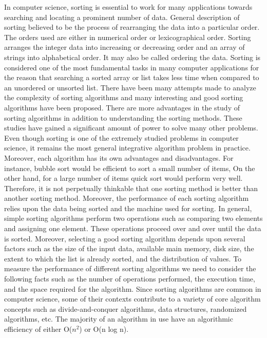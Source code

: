 \documentclass{article}
\begin{document}
In computer science, sorting is essential to work for many applications towards
searching and locating a prominent number of data. General description of sorting
believed to be the process of rearranging the data into a particular order. The
orders used are either in numerical order or lexicographical order. Sorting arranges
the integer data into increasing or decreasing order and an array of strings into
alphabetical order. It may also be called ordering the data. Sorting is considered
one of the most fundamental tasks in many computer applications for the reason
that searching a sorted array or list takes less time when compared to an unordered
or unsorted list.
There have been many attempts made to analyze the complexity of sorting algorithms and many interesting and good sorting algorithms have been proposed. There
are more advantages in the study of sorting algorithms in addition to understanding
the sorting methods. These studies have gained a significant amount of power to
solve many other problems. Even though sorting is one of the extremely studied
problems in computer science, it remains the most general integrative algorithm
problem in practice.
Moreover, each algorithm has its own advantages and disadvantages. For instance, bubble sort would be efficient to sort a small number of items, On the
other hand, for a large number of items quick sort would perform very well. Therefore, it is not perpetually thinkable that one sorting method is better than another
sorting method. Moreover, the performance of each sorting algorithm relies upon
the data being sorted and the machine used for sorting.
In general, simple sorting algorithms perform two operations such as comparing
two elements and assigning one element. These operations proceed over and over until
the data is sorted. Moreover, selecting a good sorting algorithm depends
upon several factors such as the size of the input data, available main memory, disk
size, the extent to which the list is already sorted, and the distribution of values.
To measure the performance of different sorting algorithms we need to consider the
following facts such as the number of operations performed, the execution time, and
the space required for the algorithm.
Since sorting algorithms are common in computer science, some of their contexts
contribute to a variety of core algorithm concepts such as divide-and-conquer algorithms, data structures, randomized algorithms, etc. The majority of an algorithm
in use have an algorithmic efficiency of either O($n^2$) or O(n log n).\cite{karunanithi2014survey}
\end{document}
